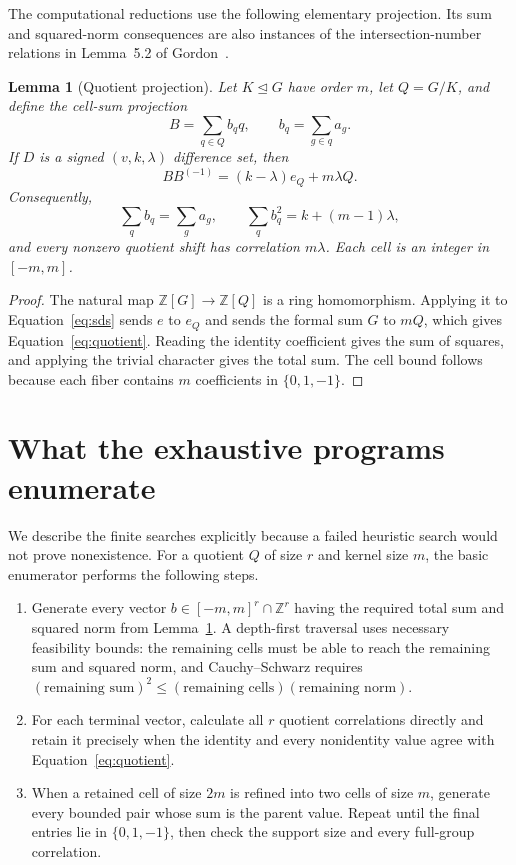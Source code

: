\documentclass[11pt]{article}
\newtheorem{lemma}{Lemma}
\theoremstyle{remark}
\newcommand{\Z}{\mathbb{Z}}
\begin{document}
The computational reductions use the following elementary projection.  Its
sum and squared-norm consequences are also instances of the
intersection-number relations in Lemma~5.2 of Gordon~\cite{gordon}.

\begin{lemma}[Quotient projection]\label{lem:projection}
Let $K\trianglelefteq G$ have order $m$, let $Q=G/K$, and define the cell-sum
projection
\[
    B=\sum_{q\in Q}b_q q, \qquad
    b_q=\sum_{g\in q}a_g.
\]
If $D$ is a signed $(v,k,\lambda)$ difference set, then
\begin{equation}\label{eq:quotient}
    BB^{(-1)}=(k-\lambda)e_Q+m\lambda Q.
\end{equation}
Consequently,
\[
    \sum_q b_q=\sum_g a_g,
    \qquad
    \sum_q b_q^2=k+(m-1)\lambda,
\]
and every nonzero quotient shift has correlation $m\lambda$.  Each cell is an
integer in $[-m,m]$.
\end{lemma}

\begin{proof}
The natural map $\Z[G]\to\Z[Q]$ is a ring homomorphism.  Applying it to
Equation~\eqref{eq:sds} sends $e$ to $e_Q$ and sends the formal sum $G$ to
$mQ$, which gives Equation~\eqref{eq:quotient}.  Reading the identity
coefficient gives the sum of squares, and applying the trivial character
gives the total sum.  The cell bound follows because each fiber contains $m$
coefficients in $\{0,1,-1\}$.
\end{proof}

\section{What the exhaustive programs enumerate}\label{sec:method}

We describe the finite searches explicitly because a failed heuristic search
would not prove nonexistence.  For a quotient $Q$ of size $r$ and kernel size
$m$, the basic enumerator performs the following steps.

\begin{enumerate}[label=\textbf{E\arabic*.},leftmargin=3em]
\item Generate every vector $b\in[-m,m]^r\cap\Z^r$ having the required total
sum and squared norm from Lemma~\ref{lem:projection}.  A depth-first traversal
uses necessary feasibility bounds: the remaining cells must be able to
reach the remaining sum and squared norm, and Cauchy--Schwarz requires
$(\text{remaining sum})^2\le
(\text{remaining cells})(\text{remaining norm})$.
\item For each terminal vector, calculate all $r$ quotient correlations
directly and retain it precisely when the identity and every nonidentity
value agree with Equation~\eqref{eq:quotient}.
\item When a retained cell of size $2m$ is refined into two cells of size
$m$, generate every bounded pair whose sum is the parent value.  Repeat until
the final entries lie in $\{0,1,-1\}$, then check the support size and every
full-group correlation.
\end{enumerate}
\end{document}
